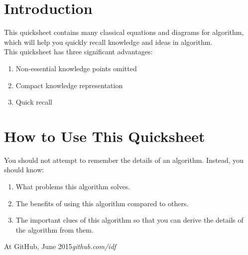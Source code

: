 %
%

\preface
\section*{Introduction}
This quicksheet contains many classical equations and diagrams for algorithm, which will help you quickly recall knowledge and ideas in algorithm.\\

This quicksheet has three significant advantages:
\begin{enumerate}
\item Non-essential knowledge points omitted
\item Compact knowledge representation
\item Quick recall
\end{enumerate}
\section*{How to Use This Quicksheet}
You should not attempt to remember the details of an algorithm. Instead, you should know:
\begin{enumerate}
\item What problems this algorithm solves.
\item The benefits of using this algorithm compared to others.
\item The important clues of this algorithm so that you can derive the details of the algorithm from them.
\end{enumerate}

\vspace{\baselineskip}
\begin{flushright}\noindent
At GitHub, June 2015\hfill {\it github.com/idf} \\
\end{flushright}
